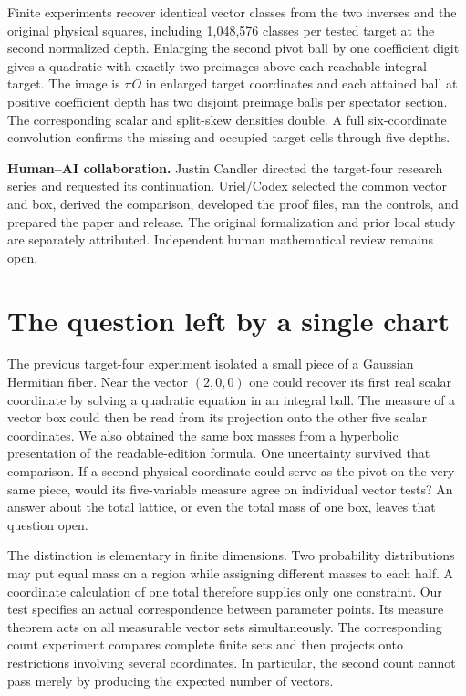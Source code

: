 \documentclass[12pt,letterpaper]{article}
\begin{document}
Finite experiments recover identical vector classes from the two inverses and the original physical squares, including 1,048,576 classes per tested target at the second normalized depth. Enlarging the second pivot ball by one coefficient digit gives a quadratic with exactly two preimages above each reachable integral target. The image is $\pi O$ in enlarged target coordinates and each attained ball at positive coefficient depth has two disjoint preimage balls per spectator section. The corresponding scalar and split-skew densities double. A full six-coordinate convolution confirms the missing and occupied target cells through five depths.

\medskip\textbf{Human--AI collaboration.} Justin Candler directed the target-four research series and requested its continuation. Uriel/Codex selected the common vector and box, derived the comparison, developed the proof files, ran the controls, and prepared the paper and release. The original formalization and prior local study are separately attributed. Independent human mathematical review remains open.
\clearpage\begingroup\small\setlength{\parskip}{0pt}\tableofcontents\endgroup
\clearpage{}
\section{The question left by a single chart}
The previous target-four experiment isolated a small piece of a Gaussian Hermitian fiber. Near the vector $(2,0,0)$ one could recover its first real scalar coordinate by solving a quadratic equation in an integral ball. The measure of a vector box could then be read from its projection onto the other five scalar coordinates. We also obtained the same box masses from a hyperbolic presentation of the readable-edition formula. One uncertainty survived that comparison. If a second physical coordinate could serve as the pivot on the very same piece, would its five-variable measure agree on individual vector tests? An answer about the total lattice, or even the total mass of one box, leaves that question open.

The distinction is elementary in finite dimensions. Two probability distributions may put equal mass on a region while assigning different masses to each half. A coordinate calculation of one total therefore supplies only one constraint. Our test specifies an actual correspondence between parameter points. Its measure theorem acts on all measurable vector sets simultaneously. The corresponding count experiment compares complete finite sets and then projects onto restrictions involving several coordinates. In particular, the second count cannot pass merely by producing the expected number of vectors.
\end{document}
